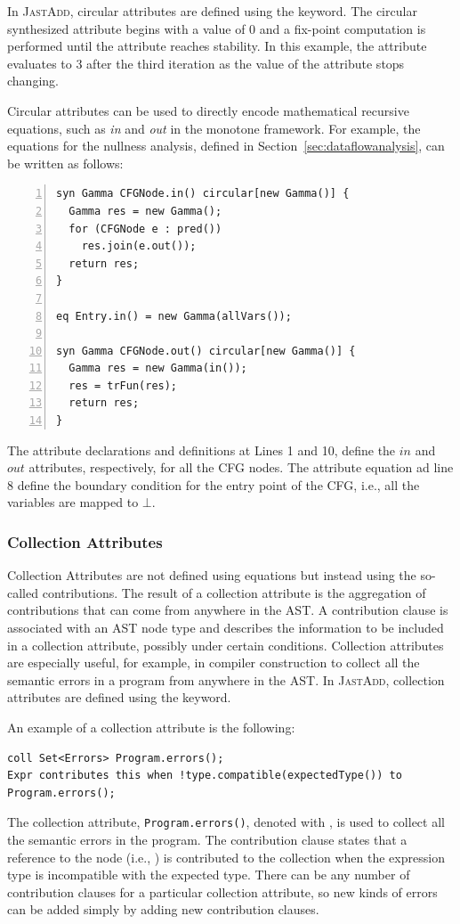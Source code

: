 In \textsc{JastAdd}, circular attributes are defined using the  keyword.
The circular synthesized attribute  begins with a value of 0 and
a fix-point computation is performed until the attribute reaches stability.
In this example, the attribute evaluates to 3 after the third iteration as
the value of the attribute stops changing.

Circular attributes can be used to directly encode mathematical recursive equations, 
such as \emph{in} and \emph{out} in the monotone framework. 
For example, the equations for the nullness analysis, defined in Section~\ref{sec:dataflowanalysis}, can be written as follows:
\begin{lstlisting}[language=JastAdd, numbers=left]
syn Gamma CFGNode.in() circular[new Gamma()] {
  Gamma res = new Gamma();
  for (CFGNode e : pred())
    res.join(e.out());
  return res;
}

eq Entry.in() = new Gamma(allVars());

syn Gamma CFGNode.out() circular[new Gamma()] {
  Gamma res = new Gamma(in());
  res = trFun(res);
  return res;
}
\end{lstlisting}
The attribute declarations and definitions at Lines 1 and 10, define the $in$ and
$out$ attributes, respectively, for all the CFG nodes.
The attribute equation ad line 8 define the boundary condition for the entry point 
of the CFG, i.e., all the variables are mapped to $\bot$.



    \subsubsection*{Collection Attributes} 
    Collection Attributes are not defined using equations but instead using the so-called contributions.
    The result of a collection attribute is the aggregation of contributions that can
    come from anywhere in the AST. A contribution clause is associated with
    an AST node type and describes the information to be included in a collection
    attribute, possibly under certain conditions. Collection attributes are especially
    useful, for example, in compiler construction to collect all the semantic errors in a program
    from anywhere in the AST. In \textsc{JastAdd}, collection attributes are defined using the
     keyword.

    An example of a collection attribute is the following:
    \begin{lstlisting}[language=JastAdd]
coll Set<Errors> Program.errors();
Expr contributes this when !type.compatible(expectedType()) to Program.errors();
    \end{lstlisting}
    The collection attribute, \texttt{Program.errors()}, denoted with ,
    is used to collect all the semantic errors in the program. The contribution clause
    states that a reference to the  node (i.e., ) is contributed to the collection when
    the expression type is incompatible with the expected type.
    There can be any number of contribution clauses for a particular collection attribute, so 
    new kinds of errors can be added simply by adding new contribution clauses.
    
